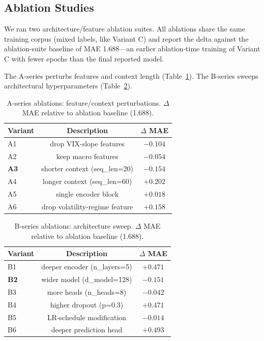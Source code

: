 \documentclass[conference]{IEEEtran}
\begin{document}
\subsection{Ablation Studies}

We ran two architecture/feature ablation suites. All ablations
share the same training corpus (mixed labels, like Variant C)
and report the delta against the ablation-suite baseline of
MAE 1.688---an earlier ablation-time training of Variant C with
fewer epochs than the final reported model.

The A-series perturbs features and context length
(Table~\ref{tab:ablation_a}). The B-series sweeps architectural
hyperparameters (Table~\ref{tab:ablation_b}).

\begin{table}[t]
\caption{A-series ablations: feature/context perturbations.
$\Delta$ MAE relative to ablation baseline (1.688).}
\label{tab:ablation_a}
\centering
\begin{tabular}{lcc}
\toprule
\textbf{Variant} & \textbf{Description} & $\Delta$ \textbf{MAE} \\
\midrule
A1 & drop VIX-slope features & $-0.104$ \\
A2 & keep macro features     & $-0.054$ \\
\textbf{A3} & shorter context (seq\_len=20) & $\boldsymbol{-0.154}$ \\
A4 & longer context (seq\_len=60)   & $+0.202$ \\
A5 & single encoder block             & $+0.018$ \\
A6 & drop volatility-regime feature & $+0.158$ \\
\bottomrule
\end{tabular}
\end{table}

\begin{table}[t]
\caption{B-series ablations: architecture sweep.
$\Delta$ MAE relative to ablation baseline (1.688).}
\label{tab:ablation_b}
\centering
\begin{tabular}{lcc}
\toprule
\textbf{Variant} & \textbf{Description} & $\Delta$ \textbf{MAE} \\
\midrule
B1 & deeper encoder (n\_layers=5)  & $+0.471$ \\
\textbf{B2} & wider model (d\_model=128) & $\boldsymbol{-0.151}$ \\
B3 & more heads (n\_heads=8)        & $-0.042$ \\
B4 & higher dropout (p=0.3)         & $+0.471$ \\
B5 & LR-schedule modification        & $-0.014$ \\
B6 & deeper prediction head           & $+0.493$ \\
\bottomrule
\end{tabular}
\end{table}
\end{document}
